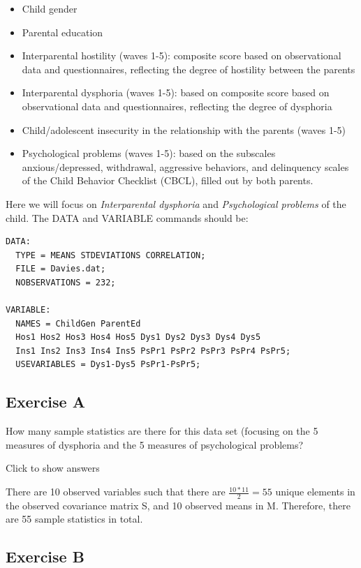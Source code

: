 \documentclass[
]{book}
\providecommand{\tightlist}{%
  \setlength{\itemsep}{0pt}\setlength{\parskip}{0pt}}
\begin{document}
\begin{itemize}
\tightlist
\item
  Child gender
\item
  Parental education
\item
  Interparental hostility (waves 1-5): composite score based on observational data and questionnaires, reflecting the degree of hostility between the parents
\item
  Interparental dysphoria (waves 1-5): based on composite score based on observational data and questionnaires, reflecting the degree of dysphoria
\item
  Child/adolescent insecurity in the relationship with the parents (waves 1-5)
\item
  Psychological problems (waves 1-5): based on the subscales anxious/depressed, withdrawal, aggressive behaviors, and delinquency scales of the Child Behavior Checklist (CBCL), filled out by both parents.
\end{itemize}

Here we will focus on \emph{Interparental dysphoria} and \emph{Psychological problems} of the child. The DATA and VARIABLE commands should be:

\begin{verbatim}
DATA: 
  TYPE = MEANS STDEVIATIONS CORRELATION;
  FILE = Davies.dat;
  NOBSERVATIONS = 232;

VARIABLE: 
  NAMES = ChildGen ParentEd
  Hos1 Hos2 Hos3 Hos4 Hos5 Dys1 Dys2 Dys3 Dys4 Dys5
  Ins1 Ins2 Ins3 Ins4 Ins5 PsPr1 PsPr2 PsPr3 PsPr4 PsPr5;
  USEVARIABLES = Dys1-Dys5 PsPr1-PsPr5;
\end{verbatim}

\hypertarget{exercise-a-1}{%
\subsection{Exercise A}\label{exercise-a-1}}

How many sample statistics are there for this data set (focusing on the 5 measures of dysphoria and the 5 measures of psychological problems?

Click to show answers

There are 10 observed variables such that there are \(\frac{10*11}{2} = 55\) unique elements in the observed covariance matrix S, and 10 observed means in M. Therefore, there are 55 sample statistics in total.

\hypertarget{exercise-b-1}{%
\subsection{Exercise B}\label{exercise-b-1}}
\end{document}
